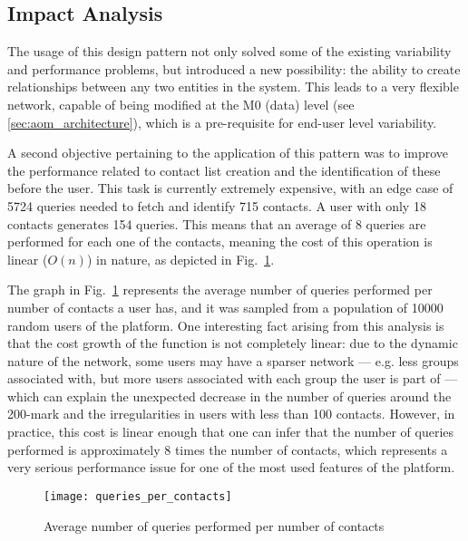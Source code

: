 \subsection{Impact Analysis}\label{sec:fa_social_network_impact_analysis}

The usage of this design pattern not only solved some of the existing variability and performance problems, but introduced a new possibility: the ability to create relationships between any two entities in the system. This leads to a very flexible network, capable of being modified at the M0 (data) level (see \ref{sec:aom_architecture}), which is a pre-requisite for end-user level variability.

A second objective pertaining to the application of this pattern was to improve the performance related to contact list creation and the identification of these before the user. This task is currently extremely expensive, with an edge case of 5724 queries needed to fetch and identify 715 contacts. A user with only 18 contacts generates 154 queries. This means that an average of 8 queries are performed for each one of the contacts, meaning the cost of this operation is linear ($O(n)$) in nature, as depicted in Fig.~\ref{fig:queries_per_contacts}. 

The graph in Fig.~\ref{fig:queries_per_contacts} represents the average number of queries performed per number of contacts a user has, and it was sampled from a population of 10000 random users of the platform. One interesting fact arising from this analysis is that the cost growth of the function is not completely linear: due to the dynamic nature of the network, some users may have a sparser network --- e.g. less groups associated with, but more users associated with each group the user is part of --- which can explain the unexpected decrease in the number of queries around the 200-mark and the irregularities in users with less than 100 contacts. However, in practice, this cost is linear enough that one can infer that the number of queries performed is approximately 8 times the number of contacts, which represents a very serious performance issue for one of the most used features of the platform.


\begin{figure}[H]
  \centering
  \texttt{[image: queries\_per\_contacts]}
  \caption{Average number of queries performed per number of contacts}
  \label{fig:queries_per_contacts}
\end{figure}

